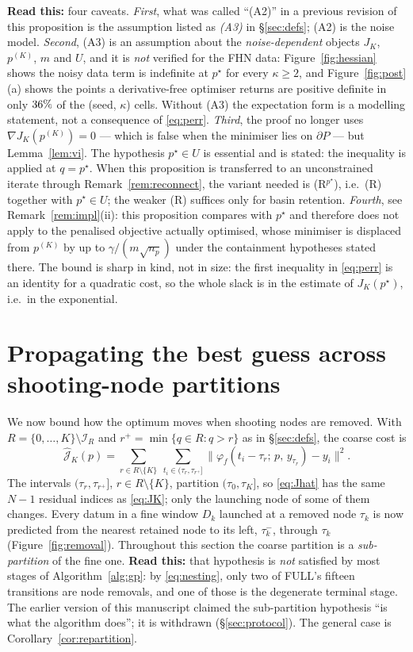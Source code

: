 \documentclass[11pt]{article}
\theoremstyle{remark}\newtheorem{remark}{Remark}
\newcommand{\pstar}{p^\star}
\newcommand{\norm}[1]{\lVert #1\rVert}
\newcommand{\flow}[3]{\varphi_f(#1;\,#2,\,#3)}
\newcommand{\hatJ}{\hat{\mathcal J}}
\newcommand{\readthis}[1]{\textbf{Read this:} #1}
\begin{document}
\readthis{four caveats.
\emph{First}, what was called ``(A2)'' in a previous revision of this proposition is the assumption listed as \emph{(A3)} in \S\ref{sec:defs}; (A2) is the noise model.
\emph{Second}, (A3) is an assumption about the \emph{noise-dependent} objects $J_K$, $p^{(K)}$, $m$ and $U$, and it is \emph{not} verified for the FHN data: Figure~\ref{fig:hessian} shows the noisy data term is indefinite at $\pstar$ for every $\kappa\ge2$, and Figure~\ref{fig:post}(a) shows the points a derivative-free optimiser returns are positive definite in only $36\%$ of the (seed, $\kappa$) cells. Without (A3) the expectation form is a modelling statement, not a consequence of \eqref{eq:perr}.
\emph{Third}, the proof no longer uses $\nabla J_K(p^{(K)})=0$ --- which is false when the minimiser lies on $\partial P$ --- but Lemma~\ref{lem:vi}. The hypothesis $\pstar\in U$ is essential and is stated: the inequality is applied at $q=\pstar$. When this proposition is transferred to an unconstrained iterate through Remark~\ref{rem:reconnect}, the variant needed is (R$^{\pstar}$), i.e.\ (R) together with $\pstar\in U$; the weaker (R) suffices only for basin retention.
\emph{Fourth}, see Remark~\ref{rem:impl}(ii): this proposition compares with $\pstar$ and therefore does not apply to the penalised objective actually optimised, whose minimiser is displaced from $p^{(K)}$ by up to $\gamma/(m\sqrt{n_p})$ under the containment hypotheses stated there.}
The bound is sharp in kind, not in size: the first inequality in \eqref{eq:perr} is an identity for a quadratic cost, so the whole slack is in the estimate of $J_K(\pstar)$, i.e.\ in the exponential.

\section{Propagating the best guess across shooting-node partitions}\label{sec:removal}
We now bound how the optimum moves when shooting nodes are removed. With $R=\{0,\dots,K\}\setminus\mathcal I_R$ and $r^{+}=\min\{q\in R:q>r\}$ as in \S\ref{sec:defs}, the coarse cost is
\begin{equation}
\hatJ_K(p)=\sum_{r\in R\setminus\{K\}}\ \sum_{t_i\in(\tau_r,\tau_{r^{+}}]}
 \norm{\flow{t_i-\tau_r}{p}{y_{\tau_r}}-y_i}^2 .
\label{eq:Jhat}
\end{equation}
The intervals $(\tau_r,\tau_{r^{+}}]$, $r\in R\setminus\{K\}$, partition $(\tau_0,\tau_K]$, so \eqref{eq:Jhat} has the same $N-1$ residual indices as \eqref{eq:JK}; only the launching node of some of them changes. Every datum in a fine window $D_k$ launched at a removed node $\tau_k$ is now predicted from the nearest retained node to its left, $\tau_k^{-}$, through $\tau_k$ (Figure~\ref{fig:removal}). Throughout this section the coarse partition is a \emph{sub-partition} of the fine one. \readthis{that hypothesis is \emph{not} satisfied by most stages of Algorithm~\ref{alg:gp}: by \eqref{eq:nesting}, only two of FULL's fifteen transitions are node removals, and one of those is the degenerate terminal stage. The earlier version of this manuscript claimed the sub-partition hypothesis ``is what the algorithm does''; it is withdrawn (\S\ref{sec:protocol}). The general case is Corollary~\ref{cor:repartition}.}
\end{document}
